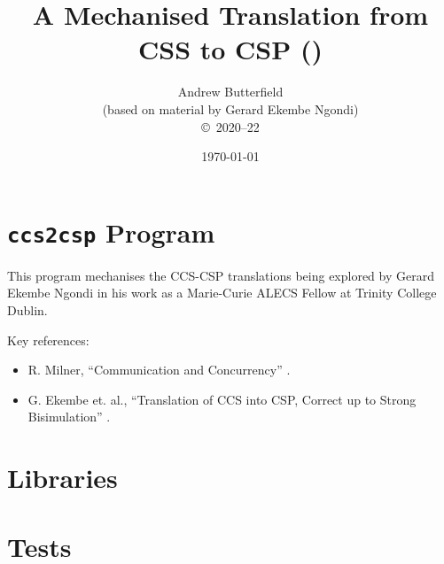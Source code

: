\documentclass[fleqn,10pt]{report}
\author{
Andrew Butterfield
\\(based on material by Gerard Ekembe Ngondi)
\\
{\small \copyright\ 2020--22}
}
\title{
  A Mechanised Translation from CSS to CSP
  (\VERSION)
}
\date{
\today
}
\begin{document}
\maketitle
\setcounter{tocdepth}{4}
\tableofcontents


\chapter{\texttt{ccs2csp} Program}

This program mechanises the CCS-CSP translations
being explored by Gerard Ekembe Ngondi
in his work as a Marie-Curie ALECS Fellow at Trinity College Dublin.

Key references:
\begin{itemize}
  \item R. Milner, ``Communication and Concurrency''
  \cite{Comm:Concur:Milner:89}.
  \item G. Ekembe et. al., ``Translation of CCS into CSP, Correct up to
Strong Bisimulation'' \cite{DBLP:conf/sefm/NgondiKB21}.
\end{itemize}

\newpage

\chapter{Libraries}

\newpage

\appendix

%


\chapter{Tests}

\newpage

% 



\end{document}
